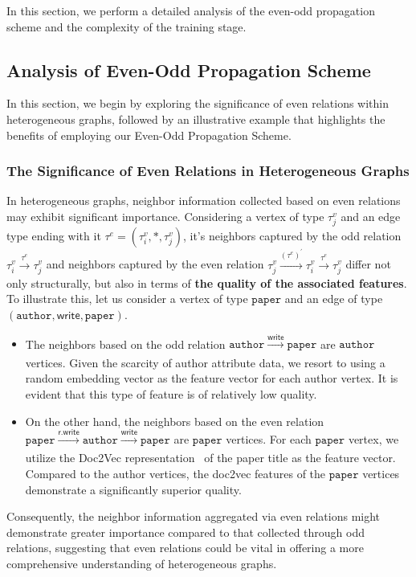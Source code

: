 \documentclass[lettersize,journal]{IEEEtran}
\begin{document}
In this section, we perform a detailed analysis of the even-odd propagation scheme and the complexity of the training stage.


\subsection{Analysis of Even-Odd Propagation Scheme}


In this section, we begin by exploring the significance of even relations within heterogeneous graphs, followed by an illustrative example that highlights the benefits of employing our Even-Odd Propagation Scheme.



\subsubsection{The Significance of Even Relations in Heterogeneous Graphs}\label{sec:sig_of_even}
In heterogeneous graphs, neighbor information collected based on even relations may exhibit significant importance.
Considering a vertex of type $\tau^{v}_j$ and an edge type ending with it $\tau^{e} = (\tau^{v}_i, *, \tau^{v}_j)$, it's neighbors captured by the odd relation $\tau^{v}_{i} \xrightarrow[]{\tau^{e}} \tau^{v}_{j}$ and neighbors captured by the even relation $\tau^{v}_{j} \xrightarrow[]{(\tau^{e})^{\prime}} \tau^{v}_{i} \xrightarrow[]{\tau^{e}} \tau^{v}_{j}$ differ not only structurally, but also in terms of \textbf{the quality of the associated features}.
To illustrate this, let us consider a vertex of type $\mathtt{paper}$ and an edge of type $(\mathtt{author}, \mathsf{write}, \mathtt{paper})$.
\begin{itemize}
\item The neighbors based on the odd relation $\mathtt{author} \xrightarrow[]{\mathsf{write}} \mathtt{paper}$ are $\mathtt{author}$ vertices. 
Given the scarcity of author attribute data, we resort to using a random embedding vector as the feature vector for each author vertex. 
It is evident that this type of feature is of relatively low quality.
\item On the other hand, the neighbors based on the even relation $\mathtt{paper} \xrightarrow[]{\mathsf{r.write}} \mathtt{author} \xrightarrow[]{\mathsf{write}} \mathtt{paper}$ are $\mathtt{paper}$ vertices. 
For each $\mathtt{paper}$ vertex, we utilize the Doc2Vec representation~\cite{DBLP:conf/icml/LeM14} of the paper title as the feature vector. 
Compared to the author vertices, the doc2vec features of the $\mathtt{paper}$ vertices demonstrate a significantly superior quality.
\end{itemize}
Consequently, the neighbor information aggregated via even relations might demonstrate greater importance compared to that collected through odd relations, suggesting that even relations could be vital in offering a more comprehensive understanding of heterogeneous graphs.
\end{document}
